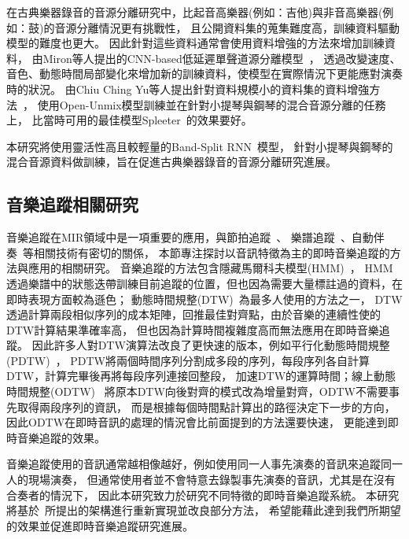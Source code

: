 \documentclass[class=NCU_thesis, crop=false]{standalone}
\begin{document}
在古典樂器錄音的音源分離研究中，比起音高樂器(例如：吉他)與非音高樂器(例如：鼓)的音源分離情況更有挑戰性，
且公開資料集的蒐集難度高，訓練資料驅動模型的難度也更大。
因此針對這些資料通常會使用資料增強的方法來增加訓練資料，
由Miron等人提出的CNN-based低延遲單聲道源分離模型~\cite{miron2017generating}，
透過改變速度、音色、動態時間局部變化來增加新的訓練資料，使模型在實際情況下更能應對演奏時的狀況。
由Chiu Ching Yu等人提出針對資料規模小的資料集的資料增強方法~\cite{Chiu_ChingYu2020MixingSpecific}，
使用Open-Unmix模型訓練並在針對小提琴與鋼琴的混合音源分離的任務上，
比當時可用的最佳模型Spleeter~\cite{hennequin2020spleeter}的效果要好。

本研究將使用靈活性高且較輕量的Band-Split RNN~\cite{Luo_Yi2022MusicSourceSeparation}模型，
針對小提琴與鋼琴的混合音源資料做訓練，旨在促進古典樂器錄音的音源分離研究進展。


\subsection{音樂追蹤相關研究}
音樂追蹤在MIR領域中是一項重要的應用，與節拍追蹤~\cite{heydari2021don, goto2021musical, di2021downbeat}、
樂譜追蹤~\cite{henkel2019score}、自動伴奏~\cite{zhang2023design}等相關技術有密切的關係，
本節專注探討以音訊特徵為主的即時音樂追蹤的方法與應用的相關研究。
音樂追蹤的方法包含隱藏馬爾科夫模型(HMM)~\cite{cano1999score}，
HMM透過樂譜中的狀態迭帶訓練目前追蹤的位置，但也因為需要大量標註過的資料，在即時表現方面較為遜色；
動態時間規整(DTW)~\cite{Arzt2012Adaptive, Raffel2016Optimizing}為最多人使用的方法之一，
DTW透過計算兩段相似序列的成本矩陣，回推最佳對齊點，由於音樂的連續性使的DTW計算結果準確率高，
但也因為計算時間複雜度高而無法應用在即時音樂追蹤。
因此許多人對DTW演算法改良了更快速的版本，例如平行化動態時間規整(PDTW)~\cite{Wei2018Online}，
PDTW將兩個時間序列分割成多段的序列，每段序列各自計算DTW，計算完畢後再將每段序列連接回整段，
加速DTW的運算時間；線上動態時間規整(ODTW)~\cite{dixon2005ODTW, Arzt2010Towards, Lin2020AHumanComputerDuetSystem}
將原本DTW向後對齊的模式改為增量對齊，ODTW不需要事先取得兩段序列的資訊，
而是根據每個時間點計算出的路徑決定下一步的方向，因此ODTW在即時音訊的處理的情況會比前面提到的方法還要快速，
更能達到即時音樂追蹤的效果。

音樂追蹤使用的音訊通常越相像越好，例如使用同一人事先演奏的音訊來追蹤同一人的現場演奏，
但通常使用者並不會特意去錄製事先演奏的音訊，尤其是在沒有合奏者的情況下，
因此本研究致力於研究不同特徵的即時音樂追蹤系統。
本研究將基於~\cite{Lin2020AHumanComputerDuetSystem}所提出的架構進行重新實現並改良部分方法，
希望能藉此達到我們所期望的效果並促進即時音樂追蹤研究進展。


\pagebreak
\end{document}
